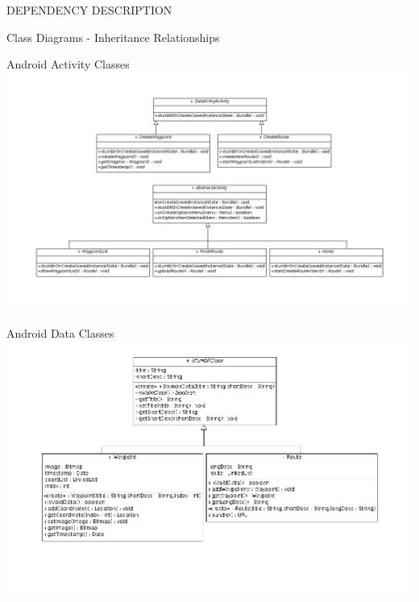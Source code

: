 \documentclass{article}
\begin{document}
\begin{section}{DEPENDENCY DESCRIPTION}
	\begin{subsection}{Class Diagrams - Inheritance Relationships}
		\begin{subsubsection}{Android Activity Classes}
			\includegraphics[angle=270,width=0.73\columnwidth]{../ClassDiagrams/InterfaceClassDiagram.png}
		\end{subsubsection}
		
		\clearpage
		\begin{subsubsection}{Android Data Classes}
			\includegraphics[angle=270,width=0.8\columnwidth]{../ClassDiagrams/DataStructuresClassDiagram.png}
		\end{subsubsection}
	\end{subsection}
\end{section}
\end{document}
